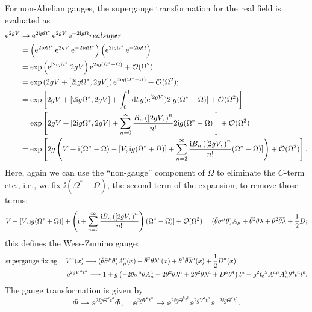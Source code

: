 \documentclass[CheatSheet]{subfiles}
\begin{document}
For non-Abelian gauges, the supergauge transformation for the real field is evaluated as
\begin{align}
  \ee^{2g V}
&\to
\ee^{2\ii g \Omega^{*}}
 \ee^{2g V}
\ee^{-2\ii g \Omega}
real super\\&=
\left(\ee^{2\ii g\Omega^*}\ee^{2g V}\ee^{-2\ii g\Omega^*}\right)
\left(\ee^{2\ii g\Omega^*}\ee^{-2\ii g\Omega}\right)
\\&=\exp\left(\ee^{[2\ii g\Omega^*,}2gV\right)\ee^{2\ii g(\Omega^*-\Omega)}+\Order(\Omega^2)
\\&=\exp\left(2gV+[2\ii g\Omega^*,2gV]\right)\ee^{2\ii g(\Omega^*-\Omega)}+\Order(\Omega^2);
\\&=\exp\left[
2gV+[2\ii g\Omega^*,2gV] + \int_0^1\dd t\,g(\ee^{[2gV,})2\ii g(\Omega^*-\Omega)]+\Order(\Omega^2)
\right]
\\&=\exp\left[
2gV+[2\ii g\Omega^*,2gV] + \sum_{n=0}^{\infty}\frac{B_n\left([2gV,\right)^n}{n!}2\ii g(\Omega^*-\Omega)]
\right]+\Order(\Omega^2)
\\&=\exp\left[
2g\left(
V + \ii (\Omega^*-\Omega) - [V,\ii g(\Omega^*+\Omega)]+
 \sum_{n=2}^{\infty}\frac{\ii B_n\left([2gV,\right)^n}{n!} (\Omega^*-\Omega)]
\right)+\Order(\Omega^2)
\right].
\end{align}
Here, again we can use the ``non-gauge'' component of $\Omega$ to eliminate the $C$-term etc., i.e., we fix $\ii(\Omega^*-\Omega)$, the second term of the expansion, to remove those terms:
\begin{equation}
 V - [V,\mathrm{i} g(\Omega^*+\Omega)]+
 \left(\mathrm{i}+
\sum_{n=2}^{\infty}\frac{\mathrm{i} B_n\left([2gV,\right)^n}{n!}\right) (\Omega^*-\Omega)]+\operatorname{\mathcal{O}}(\Omega^2)
=(\bar\theta\bar\sigma^{\mu}\theta)A_{\mu}+\bar\theta^2\theta\lambda+\theta^2\bar\theta\bar{\lambda}+\frac{1}{2}D;
\end{equation}
this defines the Wess-Zumino gauge:
\begin{align}
 \text{supergauge fixing:}\quad &V^a(x)\longrightarrow(\bar\theta\bar\sigma^{\mu}\theta)A^a_{\mu}(x)+\bar\theta^2\theta\lambda^a(x)+\theta^2\bar\theta\bar{\lambda}^a(x)+\frac{1}{2}D^a(x),
\\
& \mathop{}\!\mathrm{e}^{2gV^at^a}\longrightarrow
 1 +g\left(
  - 2\theta \sigma^{\mu}\bar\theta A^a_{\mu} +2\theta^2\bar\theta \bar\lambda^a+2\bar\theta^2\theta\lambda^a
  + D^a\theta^4
\right)t^a
 +g^2Q^2A^{a\mu} A^b_\mu\theta^4t^at^b.
\end{align}
The gauge transformation is given by
\begin{equation}
  \Phi\to \ee^{2\ii g \Theta^at^a}\Phi,
\quad
  \ee^{2g V^at^a}\to\ee^{2\ii g \Theta^bt^b} \ee^{2g V^at^a}\ee^{-2\ii g \Theta^ct^c}.
\end{equation}
\end{document}
